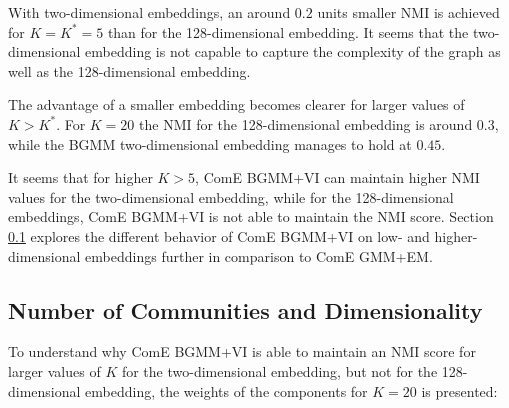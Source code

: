 \documentclass[conference]{IEEEtran}
\begin{document}
With two-dimensional embeddings, an around $0.2$ units smaller NMI is achieved for $K=K^*=5$ than for the 128-dimensional embedding. It seems that the two-dimensional embedding is not capable to capture the complexity of the graph as well as the 128-dimensional embedding.

The advantage of a smaller embedding becomes clearer for larger values of $K>K^*$. For $K=20$ the NMI for the 128-dimensional embedding is around $0.3$, while the BGMM two-dimensional embedding manages to hold at $0.45$.

It seems that for higher $K>5$, ComE BGMM+VI can maintain higher NMI values for the two-dimensional embedding, while for the 128-dimensional embeddings, ComE BGMM+VI is not able to maintain the NMI score. Section \ref{sec:eval_DBLP_result_k} explores the different behavior of ComE BGMM+VI on low- and higher-dimensional embeddings further in comparison to ComE GMM+EM.


\subsection{Number of Communities and Dimensionality}
\label{sec:eval_DBLP_result_k}

To understand why ComE BGMM+VI is able to maintain an NMI score for larger values of $K$ for the two-dimensional embedding, but not for the 128-dimensional embedding, the weights of the components for $K=20$ is presented:
\end{document}
